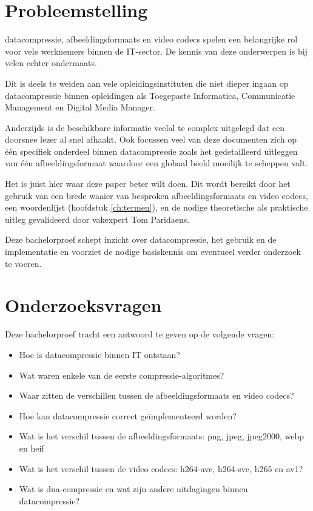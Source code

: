 \section{Probleemstelling}
\label{sec:probleemstelling}
\Gls{datacompressie}, \glspl{afbeeldingsformaat} en video \glspl{codec} spelen een belangrijke rol voor vele werknemers binnen de IT-sector. De kennis van deze onderwerpen is bij velen echter ondermaats. 

Dit is deels te weiden aan vele opleidingsinstituten die niet dieper ingaan op \gls{datacompressie} binnen opleidingen als Toegepaste Informatica, Communicatie Management en Digital Media Manager.

Anderzijds is de beschikbare informatie veelal te complex uitgelegd dat een doorsnee lezer al snel afhaakt. Ook focussen veel van deze documenten zich op één specifiek onderdeel binnen \gls{datacompressie} zoals het gedetailleerd uitleggen van één \gls{afbeeldingsformaat} waardoor een globaal beeld moeilijk te scheppen valt.

Het is juist hier waar deze paper beter wilt doen. Dit wordt bereikt door het gebruik van een brede waaier van besproken \glspl{afbeeldingsformaat} en video \glspl{codec}, een woordenlijst (hoofdstuk \ref{ch:termen}), en de nodige theoretische als praktische uitleg gevalideerd door vakexpert Tom Paridaens.

Deze bachelorproef schept inzicht over \gls{datacompressie}, het gebruik en de implementatie en voorziet de nodige basiskennis om eventueel verder onderzoek te voeren.

\section{Onderzoeksvragen}
\label{sec:onderzoeksvragen}
Deze bachelorproef tracht een antwoord te geven op de volgende vragen: 
\begin{itemize}
	\item Hoe is \gls{datacompressie} binnen IT ontstaan?
	\item Wat waren enkele van de eerste \glspl{compressie-algoritme}?
	\item Waar zitten de verschillen tussen de \glspl{afbeeldingsformaat} en video \glspl{codec}?
	\item Hoe kan \gls{datacompressie} correct geïmplementeerd worden?
	\item Wat is het verschil tussen de \glspl{afbeeldingsformaat}: \gls{png}, \gls{jpeg}, \gls{jpeg2000}, \gls{webp} en \gls{heif}
	\item Wat is het verschil tussen de video \glspl{codec}: \gls{h264-avc}, \gls{h264-svc}, \gls{h265} en \gls{av1}?
	\item Wat is \gls{dna-compressie} en wat zijn andere uitdagingen binnen \gls{datacompressie}?
\end{itemize}

